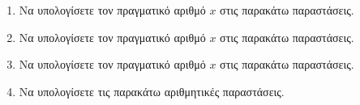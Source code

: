 \documentclass[twoside,nofonts,internet]{askhseis}
\begin{document}
\begin{enumerate}
\begin{multicols}{2}
\end{multicols}
\item Να υπολογίσετε τον πραγματικό αριθμό $ x $ στις παρακάτω παραστάσεις.
\begin{multicols}{2}
\end{multicols}
\item Να υπολογίσετε τον πραγματικό αριθμό $ x $ στις παρακάτω παραστάσεις.
\begin{multicols}{2}
\end{multicols}
\item Να υπολογίσετε τον πραγματικό αριθμό $ x $ στις παρακάτω παραστάσεις.
\begin{multicols}{2}
\end{multicols}
\item Να υπολογίσετε τις παρακάτω αριθμητικές παραστάσεις.
\begin{multicols}{2}
\end{multicols}
\end{enumerate}
\end{document}
